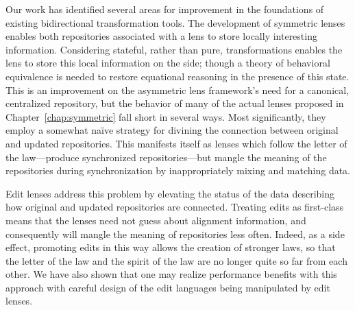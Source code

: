 %
Our work has identified several areas for improvement in the foundations of
existing bidirectional transformation tools. The development of symmetric
lenses enables both repositories associated with a lens to store locally
interesting information. Considering stateful, rather than pure,
transformations enables the lens to store this local information on the
side; though a theory of behavioral equivalence is needed to restore
equational reasoning in the presence of this state. This is an improvement
on the asymmetric lens framework's need for a canonical, centralized
repository, but the behavior of many of the actual lenses proposed in
Chapter~\ref{chap:symmetric} fall short in several ways. Most
significantly, they employ a somewhat na\"ive strategy for divining the
connection between original and updated repositories. This manifests itself
as lenses which follow the letter of the law---produce synchronized
repositories---but mangle the meaning of the repositories during
synchronization by inappropriately mixing and matching data.

Edit lenses address this problem by elevating the status of the data
describing how original and updated repositories are connected. Treating
edits as first-class means that the lenses need not guess about alignment
information, and consequently will mangle the meaning of repositories less
often. Indeed, as a side effect, promoting edits in this way allows the
creation of stronger laws, so that the letter of the law and the spirit of
the law are no longer quite so far from each other. We have also shown that
one may realize performance benefits with this approach with careful design
of the edit languages being manipulated by edit lenses.

